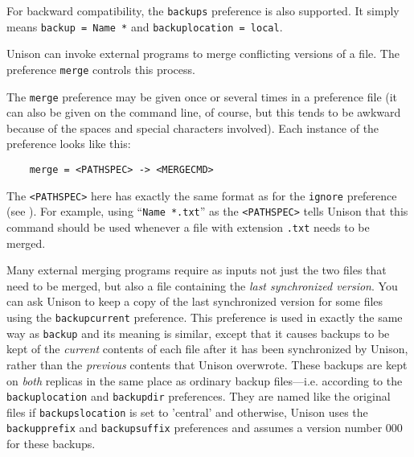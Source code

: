 \documentclass{article}
\begin{document}
For backward compatibility, the \verb|backups| preference is also supported.
%
It simply means \verb|backup = Name *| and \verb|backuplocation = local|.



Unison can invoke external programs to merge conflicting versions of a file.
The preference \verb|merge| controls this process.  

The \verb|merge| preference may be given once or several times in a
preference file (it can also be given on the command line, of course, but
this tends to be awkward because of the spaces and special characters
involved).  Each instance of the preference looks like this:
\begin{verbatim}
    merge = <PATHSPEC> -> <MERGECMD>
\end{verbatim}
The \verb|<PATHSPEC>| here has exactly the same format as for the
\verb|ignore| preference (see ).  For example,
using ``\verb|Name *.txt|'' as the \verb|<PATHSPEC>| tells Unison that this
command should be used whenever a file with extension \verb|.txt| needs to
be merged.  

Many external merging programs require as inputs not just the two files that
need to be merged, but also a file containing the {\em last synchronized
  version}.  You can ask Unison to keep a copy of the last synchronized
version for some files using the \verb|backupcurrent| preference. This
preference is used in exactly the same way as \verb|backup| and its meaning
is similar, except that it causes backups to be kept of the {\em current}
contents of each file after it has been synchronized by Unison, rather than
the {\em previous} contents that Unison overwrote.  These backups are kept
on {\em both} replicas in the same place as ordinary backup files---i.e.
according to the \verb|backuplocation| and \verb|backupdir| preferences.
They are named like the original files if \verb|backupslocation| is set to
'central' and otherwise, Unison uses the \verb|backupprefix| and
\verb|backupsuffix| preferences and assumes a version number 000 for these
backups.
\end{document}
